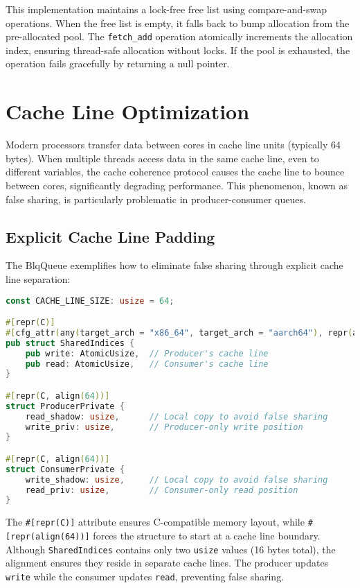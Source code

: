 This implementation maintains a lock-free free list using compare-and-swap operations. When the free list is empty, it falls back to bump allocation from the pre-allocated pool. The \texttt{fetch\_add} operation atomically increments the allocation index, ensuring thread-safe allocation without locks. If the pool is exhausted, the operation fails gracefully by returning a null pointer.

\section{Cache Line Optimization}

Modern processors transfer data between cores in cache line units (typically 64 bytes). When multiple threads access data in the same cache line, even to different variables, the cache coherence protocol causes the cache line to bounce between cores, significantly degrading performance. This phenomenon, known as false sharing, is particularly problematic in producer-consumer queues.

\subsection{Explicit Cache Line Padding}

The BlqQueue exemplifies how to eliminate false sharing through explicit cache line separation:

\begin{lstlisting}[language=Rust, style=boxed, caption={Cache line separation in BlqQueue}, label={lst:cache-separation}]
const CACHE_LINE_SIZE: usize = 64;

#[repr(C)]
#[cfg_attr(any(target_arch = "x86_64", target_arch = "aarch64"), repr(align(64)))]
pub struct SharedIndices {
    pub write: AtomicUsize,  // Producer's cache line
    pub read: AtomicUsize,   // Consumer's cache line
}

#[repr(C, align(64))]
struct ProducerPrivate {
    read_shadow: usize,      // Local copy to avoid false sharing
    write_priv: usize,       // Producer-only write position
}

#[repr(C, align(64))]
struct ConsumerPrivate {
    write_shadow: usize,     // Local copy to avoid false sharing
    read_priv: usize,        // Consumer-only read position
}
\end{lstlisting}

The \texttt{\#[repr(C)]} attribute ensures C-compatible memory layout, while \texttt{\#[repr(align(64))]} forces the structure to start at a cache line boundary. Although \texttt{SharedIndices} contains only two \texttt{usize} values (16 bytes total), the alignment ensures they reside in separate cache lines. The producer updates \texttt{write} while the consumer updates \texttt{read}, preventing false sharing.

